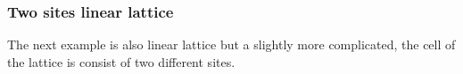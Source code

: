 \documentclass[letterpaper,10pt,english]{sphinxmanual}
\begin{document}
\subsubsection{Two sites linear lattice}
\label{\detokenize{user_model_system:two-sites-linear-lattice}}
The next example is also linear lattice but a slightly more complicated, the cell of the
lattice is consist of two different sites.

\def\sphinxLiteralBlockLabel{\label{\detokenize{user_model_system:id2}}}
%
\begin{sphinxVerbatim}[commandchars=\\\{\}]
   

       
    


\end{sphinxVerbatim}
\end{document}
